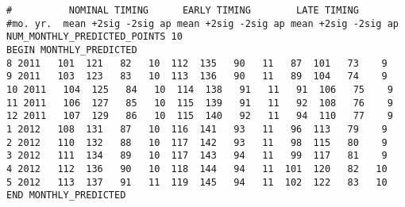 \begin{landscape}
\begin{small}
\begin{verbatim}
#          NOMINAL TIMING      EARLY TIMING        LATE TIMING
#mo. yr.  mean +2sig -2sig ap mean +2sig -2sig ap mean +2sig -2sig ap
NUM_MONTHLY_PREDICTED_POINTS 10
BEGIN MONTHLY_PREDICTED
8 2011   101  121   82   10  112  135   90   11   87  101   73    9
9 2011   103  123   83   10  113  136   90   11   89  104   74    9
10 2011   104  125   84   10  114  138   91   11   91  106   75    9
11 2011   106  127   85   10  115  139   91   11   92  108   76    9
12 2011   107  129   86   10  115  140   92   11   94  110   77    9
1 2012   108  131   87   10  116  141   93   11   96  113   79    9
2 2012   110  132   88   10  117  142   93   11   98  115   80    9
3 2012   111  134   89   10  117  143   94   11   99  117   81    9
4 2012   112  136   90   10  118  144   94   11  101  120   82   10
5 2012   113  137   91   11  119  145   94   11  102  122   83   10
END MONTHLY_PREDICTED
\end{verbatim}
\end{small}
\end{landscape}

